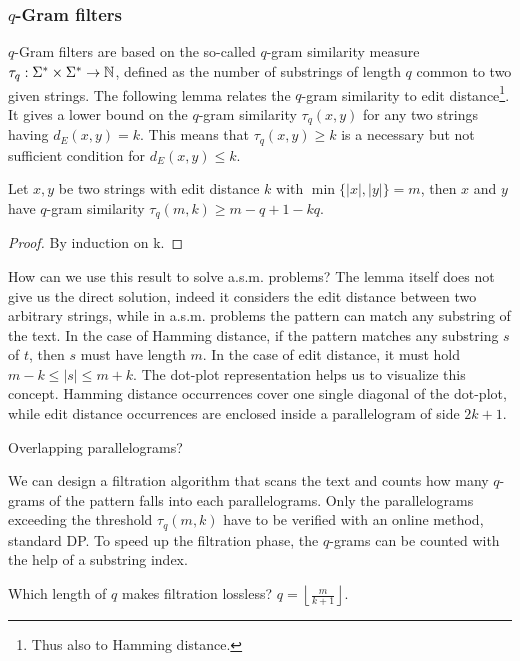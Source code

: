 \subsubsection{$q$-Gram filters}

$q$-Gram filters are based on the so-called $q$-gram similarity measure $\tau_q : \Sigma^{*} \times \Sigma^{*} \rightarrow \mathbb {N}$, defined as the number of substrings of length $q$ common to two given strings.
The following lemma relates the $q$-gram similarity to edit distance\footnote{Thus also to Hamming distance.}.
It gives a lower bound on the $q$-gram similarity $\tau_q(x,y)$ for any two strings having $d_E(x,y) = k$.
This means that $\tau_q(x,y) \geq k$ is a necessary but not sufficient condition for $d_E(x,y) \leq k$.
\begin{lemma}
\cite{?}
Let $x,y$ be two strings with edit distance $k$ with $\min\{|x|,|y|\} = m$, then $x$ and $y$ have $q$-gram similarity $\tau_q(m,k) \geq m - q + 1 - kq$.
\end{lemma}
\begin{proof}
By induction on k.
\end{proof}

\begin{example}
\end{example}

How can we use this result to solve a.s.m. problems?
The lemma itself does not give us the direct solution, indeed it considers the edit distance between two arbitrary strings, while in a.s.m. problems the pattern can match any substring of the text.
In the case of Hamming distance, if the pattern matches any substring $s$ of $t$, then $s$ must have length $m$.
In the case of edit distance, it must hold $m - k \leq |s| \leq m + k$.
The dot-plot representation helps us to visualize this concept.
Hamming distance occurrences cover one single diagonal of the dot-plot, while edit distance occurrences are enclosed inside a parallelogram of side $2k+1$.

Overlapping parallelograms?

We can design a filtration algorithm that scans the text and counts how many $q$-grams of the pattern falls into each parallelograms.
Only the parallelograms exceeding the threshold $\tau_q(m,k)$ have to be verified with an online method, \eg standard DP.
To speed up the filtration phase, the $q$-grams can be counted with the help of a substring index.

Which length of $q$ makes filtration lossless? $q=\left \lfloor \frac{m}{k+1} \right \rfloor$.

